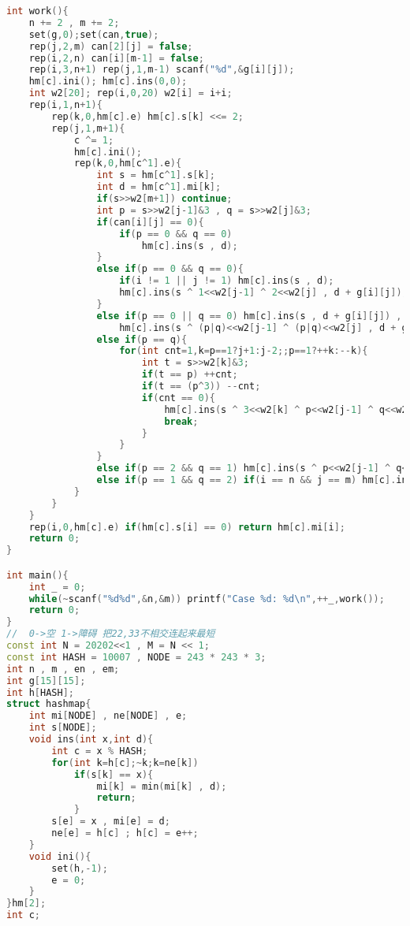 \begin{lstlisting}[language=C++]
int work(){
    n += 2 , m += 2;
    set(g,0);set(can,true);
    rep(j,2,m) can[2][j] = false;
    rep(i,2,n) can[i][m-1] = false;
    rep(i,3,n+1) rep(j,1,m-1) scanf("%d",&g[i][j]);
    hm[c].ini(); hm[c].ins(0,0);
    int w2[20]; rep(i,0,20) w2[i] = i+i;
    rep(i,1,n+1){
        rep(k,0,hm[c].e) hm[c].s[k] <<= 2;
        rep(j,1,m+1){
            c ^= 1;
            hm[c].ini();
            rep(k,0,hm[c^1].e){
                int s = hm[c^1].s[k];
                int d = hm[c^1].mi[k];
                if(s>>w2[m+1]) continue;
                int p = s>>w2[j-1]&3 , q = s>>w2[j]&3;
                if(can[i][j] == 0){
                    if(p == 0 && q == 0)
                        hm[c].ins(s , d);
                }
                else if(p == 0 && q == 0){
                    if(i != 1 || j != 1) hm[c].ins(s , d);
                    hm[c].ins(s ^ 1<<w2[j-1] ^ 2<<w2[j] , d + g[i][j]);
                }
                else if(p == 0 || q == 0) hm[c].ins(s , d + g[i][j]) ,
                    hm[c].ins(s ^ (p|q)<<w2[j-1] ^ (p|q)<<w2[j] , d + g[i][j]);
                else if(p == q){
                    for(int cnt=1,k=p==1?j+1:j-2;;p==1?++k:--k){
                        int t = s>>w2[k]&3;
                        if(t == p) ++cnt;
                        if(t == (p^3)) --cnt;
                        if(cnt == 0){
                            hm[c].ins(s ^ 3<<w2[k] ^ p<<w2[j-1] ^ q<<w2[j] , d + g[i][j]);
                            break;
                        }
                    }
                }
                else if(p == 2 && q == 1) hm[c].ins(s ^ p<<w2[j-1] ^ q<<w2[j] , d + g[i][j]);
                else if(p == 1 && q == 2) if(i == n && j == m) hm[c].ins(s ^ p<<w2[j-1] ^ q<<w2[j] , d + g[i][j]);
            }
        }
    }
    rep(i,0,hm[c].e) if(hm[c].s[i] == 0) return hm[c].mi[i];
    return 0;
}

int main(){
    int _ = 0;
    while(~scanf("%d%d",&n,&m)) printf("Case %d: %d\n",++_,work());
    return 0;
}
//	0->空 1->障碍 把22,33不相交连起来最短
const int N = 20202<<1 , M = N << 1;
const int HASH = 10007 , NODE = 243 * 243 * 3;
int n , m , en , em;
int g[15][15];
int h[HASH];
struct hashmap{
    int mi[NODE] , ne[NODE] , e;
    int s[NODE];
    void ins(int x,int d){
        int c = x % HASH;
        for(int k=h[c];~k;k=ne[k])
            if(s[k] == x){
                mi[k] = min(mi[k] , d);
                return;
            }
        s[e] = x , mi[e] = d;
        ne[e] = h[c] ; h[c] = e++;
    }
    void ini(){
        set(h,-1);
        e = 0;
    }
}hm[2];
int c;


\end{lstlisting}
